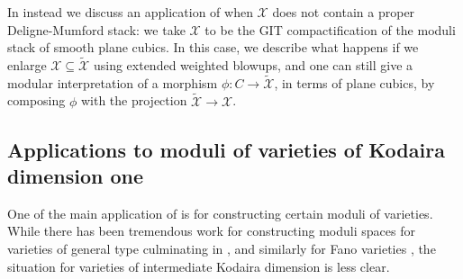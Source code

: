 \documentclass{amsart}
\newcommand{\cX}{\mathcal{X}}
\theoremstyle{definition}
\theoremstyle{definition}
\begin{document}
{In  instead we discuss an application of  when $\cX$ does not contain a proper Deligne-Mumford stack: we take $\cX$ to be the GIT compactification of the moduli stack of smooth plane cubics. 
In this case, we describe what happens if we enlarge $\cX\subseteq \widetilde{\cX}$ using extended weighted blowups, and one can still give a modular interpretation of a morphism $\phi:C\to \widetilde{\cX}$, in terms of plane cubics, by composing $\phi$ with the projection $\widetilde{\cX}\to \cX$.

\subsection{Applications to moduli of varieties of Kodaira dimension one}\label{subsectuon_k_dim_1} One of the main application of  is for constructing certain moduli of varieties.
 While there has been tremendous work for constructing moduli spaces for varieties of general type \cites{KSB,al1,HMX18,kol19} culminating in \cite{kollarmodulibook}, and similarly for Fano varieties \cites{blum2019uniqueness,alper2020reductivity,blum2021properness,blum2022openness,xu2020uniqueness,MR4445441}, the situation for varieties of intermediate Kodaira dimension is less clear.
 
}
\end{document}
